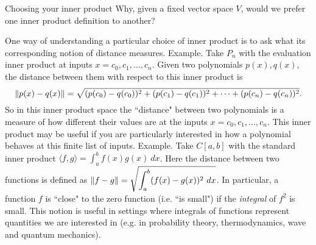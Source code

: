\begin{frame}{Choosing your inner product}
Why, given a fixed vector space $V$, would we prefer one inner product definition to another? 

One way of understanding a particular choice of inner product is to ask what its corresponding notion of distance measures. 
\bpause
\alert{Example}. Take $P_n$ with the evaluation inner product at inputs $x=c_0, c_1,\dots, c_n$. Given two polynomials $p(x), q(x)$, the distance between them with respect to this inner product is 
\[
\left\lVert p(x)-q(x)\right\rVert=\sqrt{(p(c_0)-q(c_0))^2+(p(c_1)-q(c_1))^2+\cdots +(p(c_n)-q(c_n))^2}.
\]
So in this inner product space the ``distance" between two polynomials is a measure of how different their values are at the inputs $x=c_0,c_1,\dots ,c_n$. This inner product may be useful if you are particularly interested in how a polynomial behaves at this finite list of inputs. 
\bpause
\alert{Example}. Take $C[a,b]$ with the standard inner product $\langle f, g \rangle=\int_a^b f(x)g(x) \ dx$. Here the distance between two functions is defined as $\ds \norm{f-g}=\sqrt{\int_a^b (f(x)-g(x))^2 \ dx}$. In particular, a function $f$ is ``close" to the zero function (i.e. ``is small") if the {\em integral} of $f^2$ is small. This notion is useful in settings where integrals of functions represent quantities we are interested in (e.g. in probability theory, thermodynamics, wave and quantum mechanics).  
\end{frame}